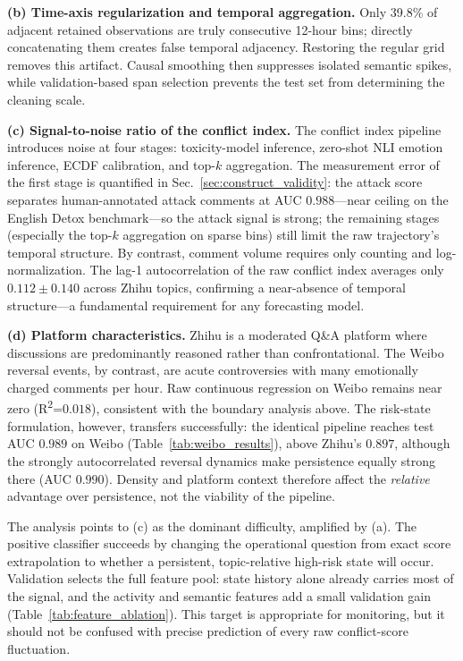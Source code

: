 \documentclass[journal]{IEEEtran}
\begin{document}
\textbf{(b) Time-axis regularization and temporal aggregation.} Only 39.8\% of adjacent retained observations are truly consecutive 12-hour bins; directly concatenating them creates false temporal adjacency. Restoring the regular grid removes this artifact. Causal smoothing then suppresses isolated semantic spikes, while validation-based span selection prevents the test set from determining the cleaning scale.

\textbf{(c) Signal-to-noise ratio of the conflict index.} The conflict index pipeline introduces noise at four stages: toxicity-model inference, zero-shot NLI emotion inference, ECDF calibration, and top-$k$ aggregation. The measurement error of the first stage is quantified in Sec.~\ref{sec:construct_validity}: the attack score separates human-annotated attack comments at AUC $0.988$---near ceiling on the English Detox benchmark---so the attack signal is strong; the remaining stages (especially the top-$k$ aggregation on sparse bins) still limit the raw trajectory's temporal structure. By contrast, comment volume requires only counting and log-normalization. The lag-1 autocorrelation of the raw conflict index averages only $0.112 \pm 0.140$ across Zhihu topics, confirming a near-absence of temporal structure---a fundamental requirement for any forecasting model.

\textbf{(d) Platform characteristics.} Zhihu is a moderated Q\&A platform where discussions are predominantly reasoned rather than confrontational. The Weibo reversal events, by contrast, are acute controversies with many emotionally charged comments per hour. Raw continuous regression on Weibo remains near zero (R\textsuperscript{2}=$0.018$), consistent with the boundary analysis above. The risk-state formulation, however, transfers successfully: the identical pipeline reaches test AUC $0.989$ on Weibo (Table~\ref{tab:weibo_results}), above Zhihu's $0.897$, although the strongly autocorrelated reversal dynamics make persistence equally strong there (AUC $0.990$). Density and platform context therefore affect the \emph{relative} advantage over persistence, not the viability of the pipeline.

The analysis points to (c) as the dominant difficulty, amplified by (a). The positive classifier succeeds by changing the operational question from exact score extrapolation to whether a persistent, topic-relative high-risk state will occur. Validation selects the full feature pool: state history alone already carries most of the signal, and the activity and semantic features add a small validation gain (Table~\ref{tab:feature_ablation}). This target is appropriate for monitoring, but it should not be confused with precise prediction of every raw conflict-score fluctuation.
\end{document}
